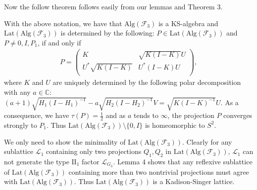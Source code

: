 \documentclass{pnastwo}
\newenvironment{proof}[1][Proof]{\begin{trivlist}
\item[\hskip \labelsep {\bfseries #1}]}{\end{trivlist}}
\newcommand{\F}{\mathcal F}
\newcommand{\LLL}{\mathcal L} %
\newcommand{\II}{\mathrm{II}}
\newcommand{\Lat}{\mathrm{Lat}}
\newcommand{\Alg}{\mathrm{Alg}}
\newcommand{\C}{\mathbb C} %
\begin{document}
\begin{article}
Now the follow theorem follows easily from our lemmas
and Theorem 3.

\begin{theorem}
With the above notation,
we have that $\Alg(\F_3)$ is a KS-algebra and $\Lat(\Alg(\F_3))$
is determined by the following: $P\in\Lat(\Alg(\F_3))$ and $P\neq
0, I, P_1$, if and only if
\begin{align*}
P=\left(
    \begin{array}{cc}
      K & \sqrt{K(I-K)}U \\
       U^{*}\sqrt{K(I-K)} & U^{*}(I-K)U \\
    \end{array}
  \right) ,
\end{align*}
where $K$ and $U$ are uniquely determined by the following polar
decomposition with any $a\in\C$: $(a+1)\sqrt{H_1(I-H_1)^{-1}} -a
\sqrt{H_2(I-H_2)^{-1}}V=\sqrt{K(I-K)^{-1}}U$. As a consequence, we
have $\tau(P)=\frac12$ and as $a$ tends to $\infty$, the
projection $P$ converges strongly to $P_1$. Thus
$\Lat(\Alg(\F_3))\setminus \{0,I\}$ is homeomorphic to $S^2$.
\end{theorem}

\begin{proof}
We only need to show the minimality
of $\Lat(\Alg(\F_3))$. Clearly for any sublattice $\LLL_1$
containing only two projections $Q_1,Q_2$ in $\Lat(\Alg(\F_3))$,
$\LLL_1$ can not generate the type $\II_1$ factor $\LLL_{G_3}$. Lemma
4 shows that any reflexive sublattice of $\Lat(\Alg(\F_3))$
containing more than two nontrivial projections must agree with
$\Lat(\Alg(\F_3))$. Thus $\Lat(\Alg(\F_3))$ is a Kadison-Singer
lattice.
\end{proof}


\end{article}
\end{document}
